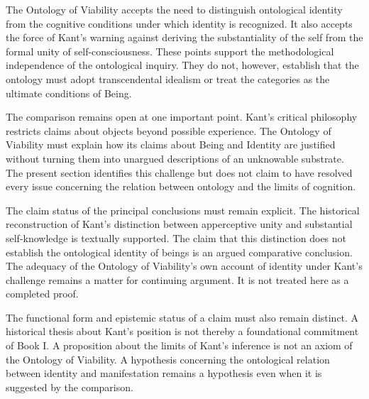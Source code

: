 \label{para:VS.B01.P01.C08.S10.SS14.P005}

The Ontology of Viability accepts the
need to distinguish ontological identity
from the cognitive conditions under
which identity is recognized. It also
accepts the force of Kant's warning
against deriving the substantiality
of the self from the formal unity
of self-consciousness. These points
support the methodological independence
of the ontological inquiry. They do
not, however, establish that the
ontology must adopt transcendental
idealism or treat the categories as
the ultimate conditions of Being.

\label{para:VS.B01.P01.C08.S10.SS14.P006}

The comparison remains open at one
important point. Kant's critical
philosophy restricts claims about
objects beyond possible experience.
The Ontology of Viability must
explain how its claims about Being
and Identity are justified without
turning them into unargued descriptions
of an unknowable substrate. The
present section identifies this
challenge but does not claim to
have resolved every issue concerning
the relation between ontology and
the limits of cognition.

\label{para:VS.B01.P01.C08.S10.SS14.P007}

The claim status of the principal
conclusions must remain explicit.
The historical reconstruction of
Kant's distinction between apperceptive
unity and substantial self-knowledge
is textually supported. The claim
that this distinction does not
establish the ontological identity
of beings is an argued comparative
conclusion. The adequacy of the
Ontology of Viability's own account
of identity under Kant's challenge
remains a matter for continuing
argument. It is not treated here
as a completed proof.

\label{para:VS.B01.P01.C08.S10.SS14.P008}

The functional form and epistemic status
of a claim must also remain distinct.
A historical thesis about Kant's
position is not thereby a foundational
commitment of Book I. A proposition
about the limits of Kant's inference
is not an axiom of the Ontology of
Viability. A hypothesis concerning
the ontological relation between
identity and manifestation remains
a hypothesis even when it is
suggested by the comparison.


